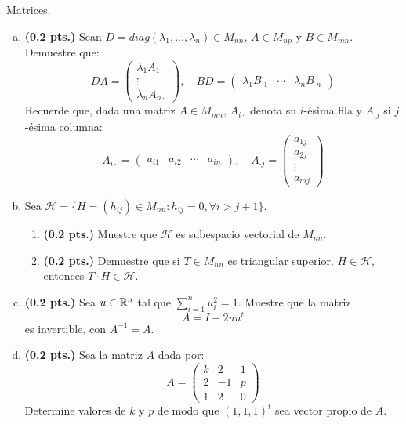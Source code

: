 \begin{problema}{Matrices.}
	\begin{enumerate}[(a)]
		\item \textbf{(0.2 pts.)} Sean $D = diag(\lambda_1, ... , \lambda_n) \in M_{nn}$, $A \in M_{np}$ y $B\in M_{mn}$. Demuestre que: 
		$$ DA = \begin{pmatrix}
			\lambda_1 A_{1\cdot} \\ \vdots \\ \lambda_n A_{n\cdot}
		\end{pmatrix}, \quad BD = \begin{pmatrix}
			\lambda_1 B_{\cdot 1} & \cdots & \lambda_n B_{\cdot n}
		\end{pmatrix}$$ 
		Recuerde que, dada una matriz $A \in M_{mn}$, $A_{i\cdot}$ denota su $i$-ésima fila y $A_{\cdot j}$ si $j$-ésima columna: 
		$$ A_{i\cdot } = \begin{pmatrix}
			a_{i1} &a_{i2} &\cdots &a_{in} 
		\end{pmatrix}, \quad A_{\cdot j} = \begin{pmatrix}
			a_{1j} \\ a_{2j} \\ \vdots \\ a_{mj}
		\end{pmatrix} $$ 
		
		\item Sea $\mathcal{H} = \{ H = (h_{ij}) \in M_{nn}: h_{ij} = 0 , \forall i > j +1 \}$. 
		\begin{enumerate}
			\item \textbf{(0.2 pts.)} Muestre que $\mathcal{H}$ es subespacio vectorial de $M_{nn}$. 
			\item \textbf{(0.2 pts.)} Demuestre que si $T \in M_{nn}$ es triangular superior, $H \in \mathcal{H}$, entonces $T \cdot H \in \mathcal{H}$. 
		\end{enumerate}
		
		\item \textbf{(0.2 pts.)} Sea $u \in \mathbb{R}^n$ tal que $\sum_{i=1}^{n} u_i^2 = 1$. Muestre que la matriz
		$$ A = I - 2 u u ^t $$ 
		es invertible, con $A^{-1} = A$. 
		
		\item \textbf{(0.2 pts.)} Sea la matriz $A$ dada por: 
		$$ A = \begin{pmatrix}
			k & 2 & 1 \\
			2 & -1 & p \\
			1 & 2 & 0 
		\end{pmatrix}$$ 
		Determine valores de $k$ y $p$ de modo que $(1, 1, 1)^t$ sea vector propio de $A$. 
	\end{enumerate}
\end{problema}